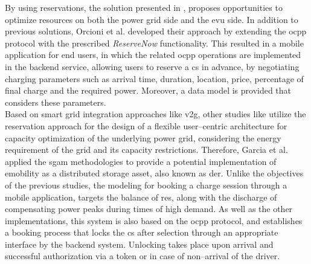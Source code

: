 By using reservations, the solution presented in \cite{orcioni_electric_2018}, proposes opportunities to optimize resources on both the power grid side and the \acrshort{evu} side.
In addition to previous solutions, Orcioni et al. developed their approach by extending the \acrshort{ocpp} protocol with the prescribed \textit{ReserveNow} functionality.
This resulted in a mobile application for end users, in which the related \acrshort{ocpp} operations are implemented in the backend service, allowing users to reserve a \acrshort{cs} in advance, by negotiating charging parameters such as arrival time, duration, location, price, percentage of final charge and the required power.
Moreover, a data model is provided that considers these parameters. \\
\noindent Based on smart grid integration approaches like \acrshort{v2g}, other studies like \cite{garcia_sgam-based_2023} utilize the reservation approach for the design of a flexible user--centric architecture for capacity optimization of the underlying power grid, considering the energy requirement of the grid and its capacity restrictions.
Therefore, Garcia et al. applied the \acrshort{sgam} \cite{noauthor_sgam_nodate} methodologies to provide a potential implementation of \acrshort{emobility} as a distributed storage asset, also known as \acrshort{der}.
Unlike the objectives of the previous studies, the modeling for booking a charge session through a mobile application, targets the balance of \acrshort{res}, along with the discharge of  compensating power peaks during times of high demand.
As well as the other implementations, this system is also based on the \acrshort{ocpp} protocol, and establishes a booking process that locks the \acrshort{cs} after selection through an appropriate interface by the backend system. Unlocking takes place upon arrival and successful authorization via a token or in case of non--arrival of the driver. \\
